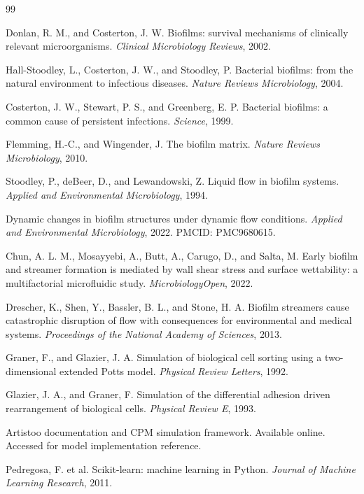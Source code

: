 \documentclass[12pt,a4paper,oneside]{report}
\begin{document}
\begin{thebibliography}{99}
{}

 Donlan, R. M., and Costerton, J. W. Biofilms: survival mechanisms of clinically relevant microorganisms. \textit{Clinical Microbiology Reviews}, 2002.

 Hall-Stoodley, L., Costerton, J. W., and Stoodley, P. Bacterial biofilms: from the natural environment to infectious diseases. \textit{Nature Reviews Microbiology}, 2004.

 Costerton, J. W., Stewart, P. S., and Greenberg, E. P. Bacterial biofilms: a common cause of persistent infections. \textit{Science}, 1999.

 Flemming, H.-C., and Wingender, J. The biofilm matrix. \textit{Nature Reviews Microbiology}, 2010.

 Stoodley, P., deBeer, D., and Lewandowski, Z. Liquid flow in biofilm systems. \textit{Applied and Environmental Microbiology}, 1994.

 Dynamic changes in biofilm structures under dynamic flow conditions. \textit{Applied and Environmental Microbiology}, 2022. PMCID: PMC9680615.

 Chun, A. L. M., Mosayyebi, A., Butt, A., Carugo, D., and Salta, M. Early biofilm and streamer formation is mediated by wall shear stress and surface wettability: a multifactorial microfluidic study. \textit{MicrobiologyOpen}, 2022.

 Drescher, K., Shen, Y., Bassler, B. L., and Stone, H. A. Biofilm streamers cause catastrophic disruption of flow with consequences for environmental and medical systems. \textit{Proceedings of the National Academy of Sciences}, 2013.

 Graner, F., and Glazier, J. A. Simulation of biological cell sorting using a two-dimensional extended Potts model. \textit{Physical Review Letters}, 1992.

 Glazier, J. A., and Graner, F. Simulation of the differential adhesion driven rearrangement of biological cells. \textit{Physical Review E}, 1993.

 Artistoo documentation and CPM simulation framework. Available online. Accessed for model implementation reference.

 Pedregosa, F. et al. Scikit-learn: machine learning in Python. \textit{Journal of Machine Learning Research}, 2011.


\end{thebibliography}
\end{document}
